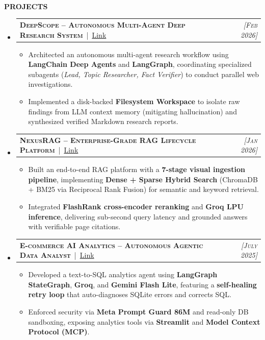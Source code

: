 \documentclass[a4paper,10pt]{article}
\makeatletter
\newcommand{\resheading}[1]{\\[-0.2cm]{\small \colorbox{mygrey}{\begin{minipage}{0.975\textwidth}{\textbf{#1}}\end{minipage}}}}
\newcommand{\ressubheading}[3]{
\begin{tabular*}{6.62in}{l @{\extracolsep{\fill}} r}
    \textsc{\textbf{#1}} \,|\, \href{#3}{Link} & \textsc{\textit{#2}} \\
\end{tabular*}\vspace{-0.2cm}}
\makeatother
\begin{document}
\resheading{\textbf{PROJECTS}}

\begin{itemize}
\item \ressubheading{DeepScope -- Autonomous Multi-Agent Deep Research System}{[Feb 2026]}{https://github.com/katta-karthik/DeepScope}
\begin{itemize}
\item Architected an autonomous multi-agent research workflow using \textbf{LangChain Deep Agents} and \textbf{LangGraph}, coordinating specialized subagents (\textit{Lead, Topic Researcher, Fact Verifier}) to conduct parallel web investigations.
\item Implemented a disk-backed \textbf{Filesystem Workspace} to isolate raw findings from LLM context memory (mitigating hallucination) and synthesized verified Markdown research reports.
\end{itemize}

\item \ressubheading{NexusRAG -- Enterprise-Grade RAG Lifecycle Platform}{[Jan 2026]}{https://github.com/katta-karthik/Nexus_RAG}
\begin{itemize}
\item Built an end-to-end RAG platform with a \textbf{7-stage visual ingestion pipeline}, implementing \textbf{Dense + Sparse Hybrid Search} (ChromaDB + BM25 via Reciprocal Rank Fusion) for semantic and keyword retrieval.
\item Integrated \textbf{FlashRank cross-encoder reranking} and \textbf{Groq LPU inference}, delivering sub-second query latency and grounded answers with verifiable page citations.
\end{itemize}

\item \ressubheading{E-commerce AI Analytics -- Autonomous Agentic Data Analyst}{[July 2025]}{https://github.com/katta-karthik/ai_agent_for_ecommerce-data}
\begin{itemize}
\item Developed a text-to-SQL analytics agent using \textbf{LangGraph StateGraph}, \textbf{Groq}, and \textbf{Gemini Flash Lite}, featuring a \textbf{self-healing retry loop} that auto-diagnoses SQLite errors and corrects SQL.
\item Enforced security via \textbf{Meta Prompt Guard 86M} and read-only DB sandboxing, exposing analytics tools via \textbf{Streamlit} and \textbf{Model Context Protocol (MCP)}.
\end{itemize}
\end{itemize}
\end{document}
